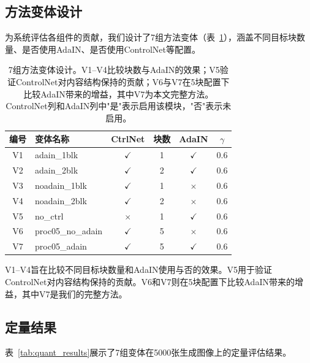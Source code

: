 \documentclass[twocolumn,a4paper,11pt]{ctexart}
\newcommand{\cmark}{$\checkmark$}
\newcommand{\xmark}{$\times$}
\begin{document}
\subsection{方法变体设计}

为系统评估各组件的贡献，我们设计了7组方法变体（表~\ref{tab:variants}），涵盖不同目标块数量、是否使用AdaIN、是否使用ControlNet等配置。

\begin{table}[ht]
  \centering
  \caption{7组方法变体设计。V1--V4比较块数与AdaIN的效果；V5验证ControlNet对内容结构保持的贡献；V6与V7在5块配置下比较AdaIN带来的增益，其中V7为本文完整方法。ControlNet列和AdaIN列中"是"表示启用该模块，"否"表示未启用。}
  \label{tab:variants}
  \footnotesize
  \setlength{\tabcolsep}{2pt}
  \begin{tabular}{clcccc}
    \toprule
    编号 & 变体名称 & CtrlNet & 块数 & AdaIN & $\gamma$ \\
    \midrule
    V1 & adain\_1blk & \cmark & 1 & \cmark & 0.6 \\
    V2 & adain\_2blk & \cmark & 2 & \cmark & 0.6 \\
    V3 & noadain\_1blk & \cmark & 1 & \xmark & 0.6 \\
    V4 & noadain\_2blk & \cmark & 2 & \xmark & 0.6 \\
    V5 & no\_ctrl & \xmark & 1 & \cmark & 0.6 \\
    V6 & proc05\_no\_adain & \cmark & 5 & \xmark & 0.6 \\
    V7 & proc05\_adain & \cmark & 5 & \cmark & 0.6 \\
    \bottomrule
  \end{tabular}
\end{table}

V1--V4旨在比较不同目标块数量和AdaIN使用与否的效果。V5用于验证ControlNet对内容结构保持的贡献。V6和V7则在5块配置下比较AdaIN带来的增益，其中V7是我们的完整方法。

\subsection{定量结果}

表~\ref{tab:quant_results}展示了7组变体在5000张生成图像上的定量评估结果。
\end{document}
